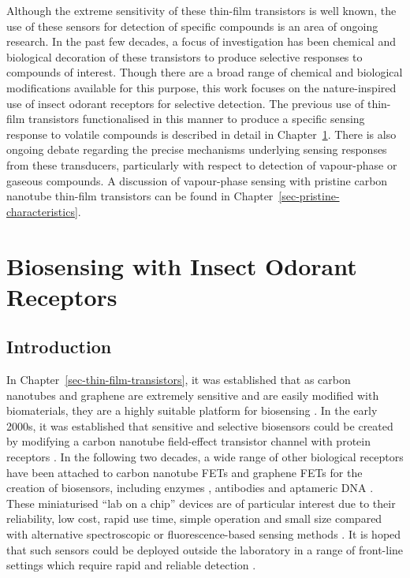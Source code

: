 \documentclass[
  a4paper,
]{scrbook}
\begin{document}
Although the extreme sensitivity of these thin-film transistors is well
known, the use of these sensors for detection of specific compounds is
an area of ongoing research. In the past few decades, a focus of
investigation has been chemical and biological decoration of these
transistors to produce selective responses to compounds of interest.
Though there are a broad range of chemical and biological modifications
available for this purpose, this work focuses on the nature-inspired use
of insect odorant receptors for selective detection. The previous use of
thin-film transistors functionalised in this manner to produce a
specific sensing response to volatile compounds is described in detail
in Chapter~\ref{sec-iOR-sensors}. There is also ongoing debate regarding
the precise mechanisms underlying sensing responses from these
transducers, particularly with respect to detection of vapour-phase or
gaseous compounds. A discussion of vapour-phase sensing with pristine
carbon nanotube thin-film transistors can be found in
Chapter~\ref{sec-pristine-characteristics}.


\hypertarget{sec-iOR-sensors}{%
\chapter{Biosensing with Insect Odorant
Receptors}\label{sec-iOR-sensors}}

\hypertarget{sec-biosensing-transducers}{%
\section{Introduction}\label{sec-biosensing-transducers}}

In Chapter~\ref{sec-thin-film-transistors}, it was established that as
carbon nanotubes and graphene are extremely sensitive and are easily
modified with biomaterials, they are a highly suitable platform for
biosensing \autocite{Kauffman2008,Ohno2010}. In the early 2000s, it was
established that sensitive and selective biosensors could be created by
modifying a carbon nanotube field-effect transistor channel with protein
receptors \autocite{Chen2003,Kauffman2008}. In the following two
decades, a wide range of other biological receptors have been attached
to carbon nanotube FETs and graphene FETs for the creation of
biosensors, including enzymes \autocite{Lee2009,Zhang2015a,Dudina2019},
antibodies \autocite{Kim2008,Jin2015,Tsang2019} and aptameric DNA
\autocite{Maehashi2007,Gao2016,Nguyen2021}. These miniaturised ``lab on
a chip'' devices are of particular interest due to their reliability,
low cost, rapid use time, simple operation and small size compared with
alternative spectroscopic or fluorescence-based sensing methods
\autocite{Khan2020}. It is hoped that such sensors could be deployed
outside the laboratory in a range of front-line settings which require
rapid and reliable detection \autocite{Dung2018,Yang2018,Kim2022a}.
\end{document}
